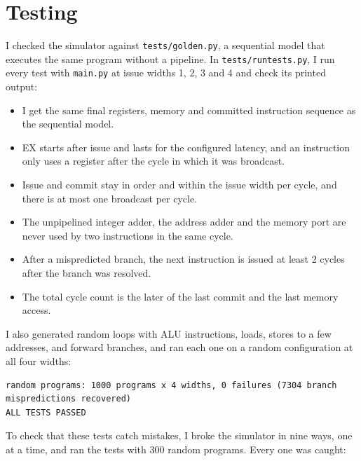 \documentclass[11pt]{article}
\renewcommand{\_}{\origunderscore\allowbreak}
\begin{document}
\section{Testing}

I checked the simulator against \texttt{tests/golden.py}, a sequential model that executes the
same program without a pipeline. In \texttt{tests/run\_tests.py}, I run every test with
\texttt{main.py} at issue widths 1, 2, 3 and 4 and check its printed output:

\begin{itemize}
  \item I get the same final registers, memory and committed instruction sequence as the
        sequential model.
  \item EX starts after issue and lasts for the configured latency, and an instruction only uses
        a register after the cycle in which it was broadcast.
  \item Issue and commit stay in order and within the issue width per cycle, and there is at most
        one broadcast per cycle.
  \item The unpipelined integer adder, the address adder and the memory port are never used by
        two instructions in the same cycle.
  \item After a mispredicted branch, the next instruction is issued at least 2 cycles after the
        branch was resolved.
  \item The total cycle count is the later of the last commit and the last memory access.
\end{itemize}

I also generated random loops with ALU instructions, loads, stores to a few addresses, and
forward branches, and ran each one on a random configuration at all four widths:

\begin{verbatim}
random programs: 1000 programs x 4 widths, 0 failures (7304 branch
mispredictions recovered)
ALL TESTS PASSED
\end{verbatim}

To check that these tests catch mistakes, I broke the simulator in nine ways, one at a time,
and ran the tests with 300 random programs. Every one was caught:
\end{document}
